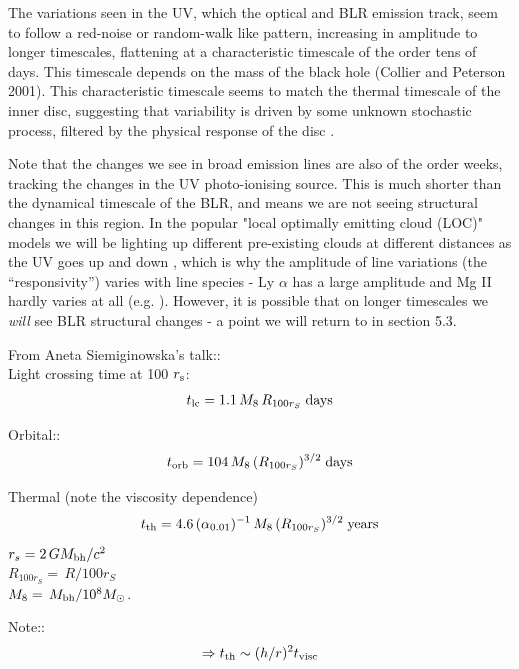 \documentclass[11pt]{article}
\begin{document}
The variations seen in the UV, which the optical and BLR emission track, seem to follow a red-noise or random-walk like pattern, increasing in amplitude to longer timescales, flattening at a characteristic timescale of the order tens of days. This timescale depends on the mass of the black hole (Collier and Peterson 2001). This characteristic timescale seems to match the thermal timescale of the inner disc, suggesting that variability is driven by some unknown stochastic process, filtered by the physical response of the disc \citep{Kelly2009, Kelly2011}.

Note that the changes we see in broad emission lines are also of the order weeks, tracking the changes in the UV photo-ionising source. This is much shorter than the dynamical timescale of the BLR, and means we are not seeing structural changes in this region. In the popular "local optimally emitting cloud (LOC)" models we will be lighting up different pre-existing clouds at different distances as the UV goes up and down \citep{Peterson2006,Goad2014}, which is why the amplitude of line variations (the ``responsivity'') varies with line species - Ly $\alpha$ has a large amplitude and Mg II hardly varies at all (e.g. \citet{Cackett2015}). However, it is possible that on longer timescales we {\em will} see BLR structural changes - a point we will return to in section 5.3.


\medskip \medskip
\noindent
From Aneta Siemiginowska's talk::\\
Light crossing time at 100 $r_{\rm s}$:
\begin{equation}
    t_{\rm lc} = 1.1 \,  M_{8} \, R_{100 r_{S}}  \; {\rm days}
\end{equation}

\noindent
Orbital::
\begin{equation}
  t_{\rm orb} = 104 \, M_{8} \,  (R_{100r_{S}})^{3/2} \;  {\rm days}
\end{equation}

\noindent
Thermal (note the viscosity dependence)
\begin{equation}
  t_{\rm th} = 4.6 \, (\alpha_{0.01})^{-1} \, M_{8}\, (R_{100r_{S}} )^{3/2}  \; {\rm years}
\end{equation}
$r_{s} = 2 \,  GM_{\rm bh}/c^{2}$ \\ 
$R_{100r_{S}} = \, R / 100 r_{S}$  \\
$M_{8} = \,  M_{\rm bh} /10^{8} M_{\odot}$.

\medskip
\noindent
Note:: 
\begin{equation}
  \Rightarrow t_{\rm th} \sim (h/r)^{2} t_{\rm visc}
\end{equation}
\end{document}
